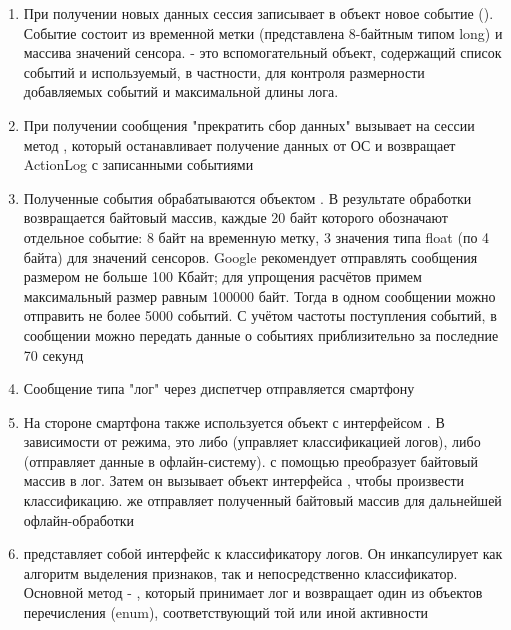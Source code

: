 \begin{enumerate}
\item При получении новых данных сессия записывает в объект  новое событие (). Событие состоит из временной метки (представлена 8-байтным типом long) и массива значений сенсора.  - это вспомогательный объект, содержащий список событий и используемый, в частности, для контроля размерности добавляемых событий и максимальной длины лога.
\item При получении сообщения "прекратить сбор данных"  вызывает на сессии метод , который останавливает получение данных от ОС и возвращает ActionLog с записанными событиями
\item Полученные события обрабатываются объектом . В результате обработки возвращается байтовый массив, каждые 20 байт которого обозначают отдельное событие: 8 байт на временную метку, 3 значения типа float (по 4 байта) для значений сенсоров. Google рекомендует отправлять сообщения размером не больше 100 Кбайт; для упрощения расчётов примем максимальный размер равным 100000 байт. Тогда в одном сообщении можно отправить не более 5000 событий. С учётом частоты поступления событий, в сообщении можно передать данные о событиях приблизительно за последние 70 секунд
\item Сообщение типа "лог" через диспетчер отправляется смартфону
\item На стороне смартфона также используется объект с интерфейсом . В зависимости от режима, это либо  (управляет классификацией логов), либо  (отправляет данные в офлайн-систему).  с помощью  преобразует байтовый массив в лог. Затем он вызывает объект интерфейса , чтобы произвести классификацию.  же отправляет полученный байтовый массив для дальнейшей офлайн-обработки
\item {} представляет собой интерфейс к классификатору логов. Он инкапсулирует как алгоритм выделения признаков, так и непосредственно классификатор. Основной метод - , который принимает лог и возвращает один из объектов перечисления (enum), соответствующий той или иной активности
\end{enumerate}
